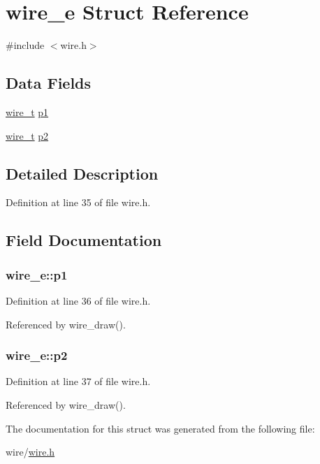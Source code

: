 \hypertarget{structwire__e}{\section{wire\-\_\-e Struct Reference}
\label{structwire__e}
}


{\ttfamily \#include $<$wire.\-h$>$}

\subsection*{Data Fields}
\begin{DoxyCompactItemize}
\item 
\hyperlink{wire_8h_ace84d5e6e326f6a52d978bd9900baee6}{wire\-\_\-t} \hyperlink{structwire__e_a00cfec6074c9bfb7f674fed20174abad}{p1}
\item 
\hyperlink{wire_8h_ace84d5e6e326f6a52d978bd9900baee6}{wire\-\_\-t} \hyperlink{structwire__e_a2167b2f5bbd853ae35f7bb53a1a2685d}{p2}
\end{DoxyCompactItemize}


\subsection{Detailed Description}


Definition at line 35 of file wire.\-h.



\subsection{Field Documentation}
\hypertarget{structwire__e_a00cfec6074c9bfb7f674fed20174abad}{
\subsubsection[{p1}]{ wire\-\_\-e\-::p1}}\label{structwire__e_a00cfec6074c9bfb7f674fed20174abad}


Definition at line 36 of file wire.\-h.



Referenced by wire\-\_\-draw().

\hypertarget{structwire__e_a2167b2f5bbd853ae35f7bb53a1a2685d}{
\subsubsection[{p2}]{ wire\-\_\-e\-::p2}}\label{structwire__e_a2167b2f5bbd853ae35f7bb53a1a2685d}


Definition at line 37 of file wire.\-h.



Referenced by wire\-\_\-draw().



The documentation for this struct was generated from the following file\-:\begin{DoxyCompactItemize}
\item 
wire/\hyperlink{wire_8h}{wire.\-h}\end{DoxyCompactItemize}
